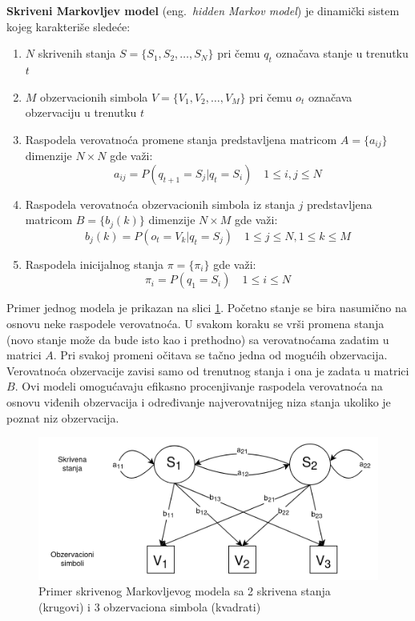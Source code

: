 \documentclass[a4paper]{article}
\begin{document}
\textbf{Skriveni Markovljev model} (eng.~{\em hidden Markov model}) je dinamički sistem kojeg karakteriše sledeće:
\begin{enumerate}
  \item $N$ skrivenih stanja $S = \{S_1, S_2, \dots, S_N\}$ pri čemu $q_t$ označava stanje u trenutku $t$
  \item $M$ obzervacionih simbola $V = \{V_1, V_2, \dots, V_M\}$ pri čemu $o_t$ označava obzervaciju u trenutku $t$
  \item Raspodela verovatnoća promene stanja predstavljena matricom $A=\{a_{ij}\}$ dimenzije $N \times N$ gde važi: $$a_{ij} = P(q_{t+1} = S_j | q_{t} = S_i) \quad 1 \leq i,j \leq N$$
  \item Raspodela verovatnoća obzervacionih simbola iz stanja $j$ predstavljena matricom $B=\{b_j(k)\}$ dimenzije $N \times M$ gde važi: $$b_j(k) = P(o_t = V_k | q_t = S_j) \quad 1 \leq j \leq N, 1 \leq k \leq M$$
  \item Raspodela inicijalnog stanja $\pi=\{\pi_i\}$ gde važi: $$\pi_i = P(q_1 = S_i) \quad 1 \leq i \leq N$$
\end{enumerate}
Primer jednog modela je prikazan na slici \ref{fig:hmm}. Početno stanje se bira nasumično na osnovu neke raspodele verovatnoća.
U svakom koraku se vrši promena stanja (novo stanje može da bude isto kao i prethodno) sa verovatnoćama zadatim u matrici $A$.
Pri svakoj promeni očitava se tačno jedna od mogućih obzervacija. Verovatnoća obzervacije zavisi samo od trenutnog stanja i ona je zadata u matrici $B$.
Ovi modeli omogućavaju efikasno procenjivanje raspodela verovatnoća na osnovu viđenih obzervacija i određivanje najverovatnijeg niza stanja ukoliko je poznat niz obzervacija.

\begin{figure}[h!]
  \begin{center}
    \includegraphics[scale=0.3]{hmm.png}
  \end{center}
  \caption{Primer skrivenog Markovljevog modela sa 2 skrivena stanja (krugovi) i 3 obzervaciona simbola (kvadrati)}
  \label{fig:hmm}
\end{figure}
\end{document}
